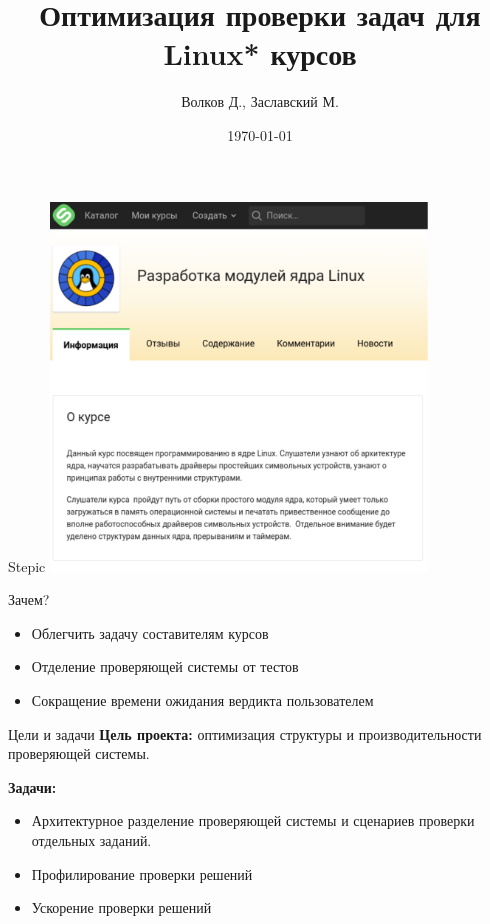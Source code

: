 \documentclass{beamer}
\begin{document}
\title{Оптимизация проверки задач для Linux* курсов}  
\author{Волков Д., Заславский М.}
\date{\today} 

\frame{\titlepage} 

\begin{frame}{Stepic}
	\includegraphics[width=100mm]{./stepic.pdf}
\end{frame}

\begin{frame}{Зачем?}
	\begin{itemize}
		\item Облегчить задачу составителям курсов
		\item Отделение проверяющей системы от тестов
		\item Сокращение времени ожидания вердикта пользователем
	\end{itemize}
\end{frame}

\begin{frame}{Цели и задачи}
	\textbf{Цель проекта:} оптимизация структуры и производительности проверяющей системы.

	\textbf{Задачи:}
	\begin{itemize}
		\item Архитектурное разделение проверяющей системы и сценариев проверки отдельных заданий.
		\item Профилирование проверки решений
		\item Ускорение проверки решений 
	\end{itemize}
\end{frame}
\end{document}
